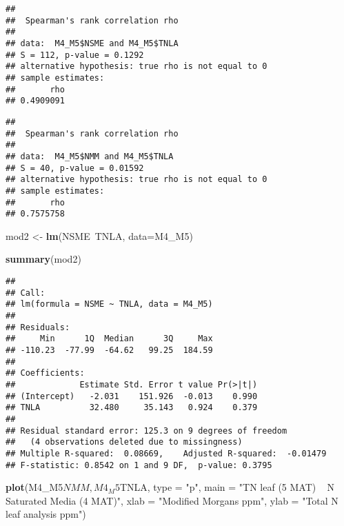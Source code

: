 \documentclass[]{article}
\newenvironment{Shaded}{\begin{snugshade}}{\end{snugshade}}
\newcommand{\KeywordTok}[1]{\textcolor[rgb]{0.13,0.29,0.53}{\textbf{{#1}}}}
\newcommand{\DataTypeTok}[1]{\textcolor[rgb]{0.13,0.29,0.53}{{#1}}}
\newcommand{\StringTok}[1]{\textcolor[rgb]{0.31,0.60,0.02}{{#1}}}
\newcommand{\OtherTok}[1]{\textcolor[rgb]{0.56,0.35,0.01}{{#1}}}
\newcommand{\NormalTok}[1]{{#1}}
\begin{document}
\begin{verbatim}
## 
##  Spearman's rank correlation rho
## 
## data:  M4_M5$NSME and M4_M5$TNLA
## S = 112, p-value = 0.1292
## alternative hypothesis: true rho is not equal to 0
## sample estimates:
##       rho 
## 0.4909091
\end{verbatim}

\begin{Shaded}
\end{Shaded}

\begin{verbatim}
## 
##  Spearman's rank correlation rho
## 
## data:  M4_M5$NMM and M4_M5$TNLA
## S = 40, p-value = 0.01592
## alternative hypothesis: true rho is not equal to 0
## sample estimates:
##       rho 
## 0.7575758
\end{verbatim}

\begin{Shaded}
\begin{Highlighting}[]
\NormalTok{mod2 <-}\StringTok{ }\KeywordTok{lm}\NormalTok{(NSME~TNLA, }\DataTypeTok{data=}\NormalTok{M4_M5)}

\KeywordTok{summary}\NormalTok{(mod2)}
\end{Highlighting}
\end{Shaded}

\begin{verbatim}
## 
## Call:
## lm(formula = NSME ~ TNLA, data = M4_M5)
## 
## Residuals:
##     Min      1Q  Median      3Q     Max 
## -110.23  -77.99  -64.62   99.25  184.59 
## 
## Coefficients:
##             Estimate Std. Error t value Pr(>|t|)
## (Intercept)   -2.031    151.926  -0.013    0.990
## TNLA          32.480     35.143   0.924    0.379
## 
## Residual standard error: 125.3 on 9 degrees of freedom
##   (4 observations deleted due to missingness)
## Multiple R-squared:  0.08669,    Adjusted R-squared:  -0.01479 
## F-statistic: 0.8542 on 1 and 9 DF,  p-value: 0.3795
\end{verbatim}

\begin{Shaded}
\begin{Highlighting}[]
\KeywordTok{plot}\NormalTok{(M4_M5$NMM, M4_M5$TNLA, }\DataTypeTok{type =} \StringTok{"p"}\NormalTok{, }\DataTypeTok{main =} \StringTok{"TN leaf (5 MAT) ~ N Saturated Media (4 MAT)"}\NormalTok{, }\DataTypeTok{xlab =} \StringTok{"Modified Morgans ppm"}\NormalTok{, }\DataTypeTok{ylab =} \StringTok{"Total N leaf analysis ppm"}\NormalTok{)}
\end{Highlighting}
\end{Shaded}
\end{document}
